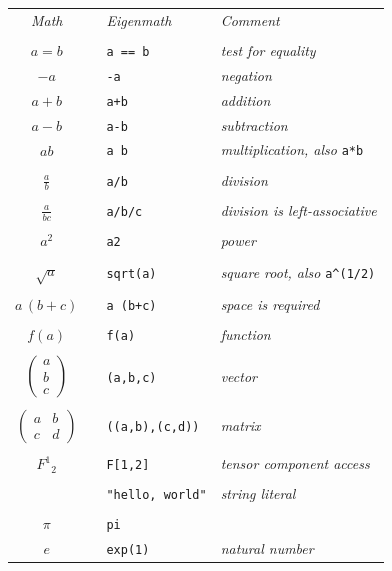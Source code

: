 \documentclass[12pt]{article}
\begin{document}
\begin{center}
\begin{tabular}{clll}
{\it Math} & & {\it Eigenmath} & {\it Comment}
\\
\\
$a=b$ & & \verb$a == b$ & {\it test for equality}
\\[1ex]
$-a$ & & {\tt -a} & {\it negation}
\\[1ex]
$a+b$ & & {\tt a+b} & {\it addition}
\\[1ex]
$a-b$ & & {\tt a-b} & {\it subtraction}
\\[1ex]
$ab$ & & {\tt a b} & {\it multiplication, also} \verb$a*b$
\\
\\
$\displaystyle\frac{a}{b}$ & & {\tt a/b} & {\it division}
\\
\\
$\displaystyle\frac{a}{bc}$ & & {\tt a/b/c} & {\it division is left-associative}
\\
\\
$a^2$ & & {\tt a{\char94}2} & {\it power}
\\
\\
$\sqrt{a}$ & & \verb$sqrt(a)$ & {\it square root, also} \verb$a^(1/2)$
\\
\\
$a\,(b+c)$ & & {\tt a (b+c)} & {\it space is required}
\\
\\
$f(a)$ & & {\tt f(a)} & {\it function}
\\
\\
$\begin{pmatrix}a\\ b\\ c\end{pmatrix}$ & & {\tt (a,b,c)} & {\it vector}
\\
\\
$\begin{pmatrix}a&b\\ c&d\end{pmatrix}$ & & {\tt ((a,b),(c,d))} & {\it matrix}
\\
\\
$F^1{}_2$ & & {\tt F[1,2]} & {\it tensor component access}
\\
\\
 & & \verb$"hello, world"$ & {\it string literal}
\\
\\
$\pi$ & & {\tt pi} &
\\[1ex]
$e$ && {\tt exp(1)} & {\it natural number}
\end{tabular}
\end{center}
\end{document}
